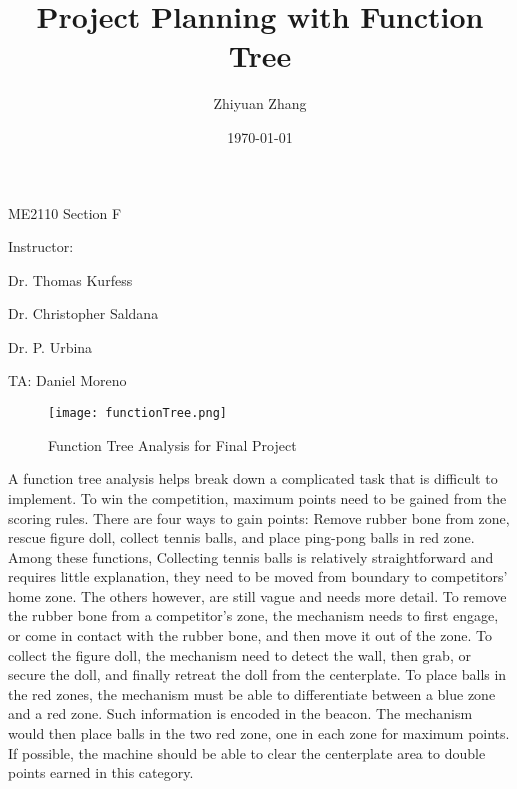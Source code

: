 \documentclass[12pt]{article}
\title{Project Planning with Function Tree}
\author{Zhiyuan Zhang}
\date{\today}
\begin{document}
\maketitle

\centerline{ME2110 Section F}
\centerline{Instructor: }
\centerline{Dr. Thomas Kurfess}
\centerline{Dr. Christopher Saldana}
\centerline{Dr. P. Urbina}
\centerline{TA: Daniel Moreno}
\newpage


\begin{figure}[H]
\centering
  \texttt{[image: functionTree.png]}
  \caption{Function Tree Analysis for Final Project}
  \label{functree}
\end{figure}

A function tree analysis helps break down a complicated task that is difficult to implement. To win the competition, maximum points need to be gained from the scoring rules. There are four ways to gain points: Remove rubber bone from zone, rescue figure doll, collect tennis balls, and place ping-pong balls in red zone. Among these functions, Collecting tennis balls is relatively straightforward and requires little explanation, they need to be moved from boundary to competitors' home zone. The others however, are still vague and needs more detail. To remove the rubber bone from a competitor's zone, the mechanism needs to first engage, or come in contact with the rubber bone, and then move it out of the zone. To collect the figure doll, the mechanism need to detect the wall, then grab, or secure the doll, and finally retreat the doll from the centerplate. To place balls in the red zones, the mechanism must be able to differentiate between a blue zone and a red zone. Such information is encoded in the beacon. The mechanism would then place balls in the two red zone, one in each zone for maximum points. If possible, the machine should be able to clear the centerplate area to double points earned in this category.
\end{document}

